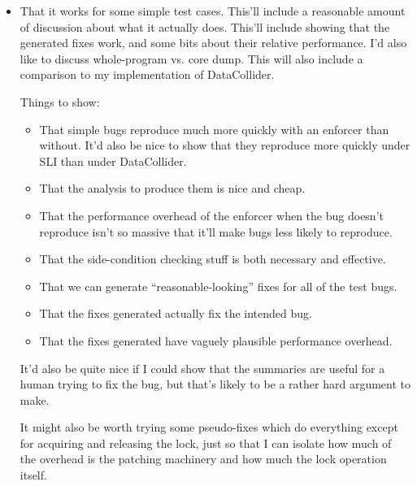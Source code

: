 \begin{itemize}
\item That it works for some simple test cases.  This'll include a
  reasonable amount of discussion about what it actually does.
  This'll include showing that the generated fixes work, and some bits
  about their relative performance.  I'd also like to discuss
  whole-program vs. core dump.  This will also include a comparison to
  my implementation of DataCollider.

  Things to show:

  \begin{itemize}
  \item That simple bugs reproduce much more quickly with an enforcer
    than without.  It'd also be
    nice to show that they reproduce more quickly under SLI than under
    DataCollider.
  \item That the analysis to produce them is nice and cheap.
  \item That the performance overhead of the enforcer when the bug
    doesn't reproduce isn't so massive that it'll make bugs less
    likely to reproduce.
  \item That the side-condition checking stuff is both necessary and
    effective.
  \item That we can generate ``reasonable-looking'' fixes for all of
    the test bugs.
  \item That the fixes generated actually fix the intended bug.

  \item That the fixes generated have vaguely plausible performance
    overhead.
  \end{itemize}

  It'd also be quite nice if I could show that the summaries are
  useful for a human trying to fix the bug, but that's likely to be a
  rather hard argument to make.

  It might also be worth trying some pseudo-fixes which do everything
  except for acquiring and releasing the lock, just so that I can
  isolate how much of the overhead is the patching machinery and how
  much the lock operation itself.


\end{itemize}
